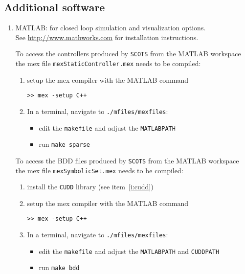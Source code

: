 \documentclass[a4paper]{amsart}
\begin{document}
\subsection{Additional software} 
\label{s:installation:cudd}
\begin{enumerate}


  \item MATLAB: for closed loop simulation and visualization options.\\
	See \url{http://www.mathworks.com} for installation instructions.

	To access the controllers produced by {\tt SCOTS} from the MATLAB workspace
  the mex file {\tt mexStaticController.mex}  needs to be compiled:
	\begin{enumerate}
 	\item setup the mex compiler with the MATLAB command
	\begin{lstlisting}[basicstyle=\small\ttfamily,frame=none]
	>> mex -setup C++
	\end{lstlisting}
	\item In a terminal, navigate to {\tt\small ./mfiles/mexfiles}:
	\begin{itemize}
    \item edit the {\tt makefile} and adjust the {\tt MATLABPATH} 
		\item run  {\tt make sparse}
  \end{itemize}
  \end{enumerate}

 To access the BDD files produced by {\tt SCOTS} from the MATLAB workspace the
  mex file {\tt mexSymbolicSet.mex} needs to be compiled:
	\begin{enumerate}
  \item install the {\tt CUDD} library (see item~\ref{i:cudd})
 	\item setup the mex compiler with the MATLAB command
	\begin{lstlisting}[basicstyle=\small\ttfamily,frame=none]
	>> mex -setup C++
	\end{lstlisting}
	\item In a terminal, navigate to {\tt\small ./mfiles/mexfiles}:
	\begin{itemize}
		\item edit the {\tt makefile} and adjust the {\tt MATLABPATH} and {\tt CUDDPATH}
		\item run  {\tt make bdd}
	 \end{itemize}
  \end{enumerate}



\end{enumerate}
\end{document}
